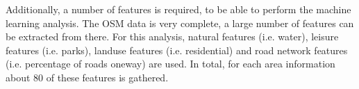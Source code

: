 Additionally, a number of features is required, to be able to perform the machine learning analysis. The OSM data is very complete, a large number of features can
be extracted from there. For this analysis, natural features (i.e. water), leisure features (i.e. parks), landuse features (i.e. residential)
and road network features (i.e. percentage of roads oneway) are used. In total, for each area information about 80 of these features is gathered.
